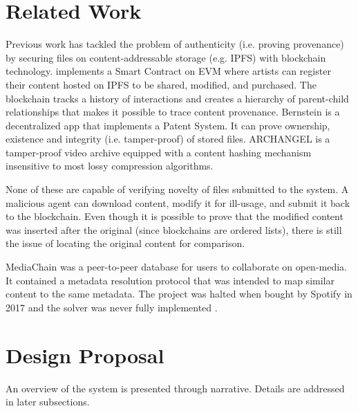 \documentclass[conference]{IEEEtran}
\begin{document}
\section{Related Work}
Previous work has tackled the problem of authenticity (i.e. proving provenance) by securing files on content-addressable storage (e.g. IPFS) with blockchain technology. \cite{hasan2019combating} implements a Smart Contract on EVM where artists can register their content hosted on IPFS to be shared, modified, and purchased. The blockchain tracks a history of interactions and creates a hierarchy of parent-child relationships that makes it possible to trace content provenance. Bernstein \cite{Bernstein} is a decentralized app that implements a Patent System. It can prove ownership, existence and integrity (i.e. tamper-proof) of stored files. ARCHANGEL \cite{bui2019archangel} is a tamper-proof video archive equipped with a content hashing mechanism insensitive to most lossy compression algorithms.

None of these are capable of verifying novelty of files submitted to the system. A malicious agent can download content, modify it for ill-usage, and submit it back to the blockchain. Even though it is possible to prove that the modified content was inserted after the original (since blockchains are ordered lists), there is still the issue of locating the original content for comparison. 

MediaChain was a peer-to-peer database for users to collaborate on open-media. It contained a metadata resolution protocol that was intended to map similar content to the same metadata. The project was halted when bought by Spotify in 2017 and the solver was never fully implemented \cite{perez2017spotify}.



\section{Design Proposal}
An overview of the system is presented through narrative. Details are addressed in later subsections. 
\end{document}
